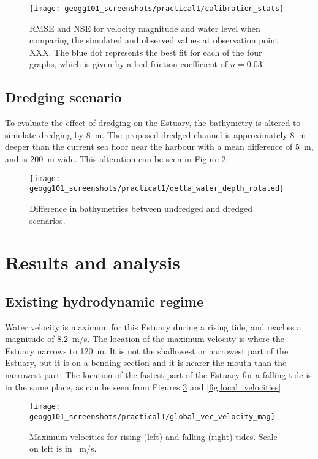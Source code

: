 \documentclass{article}
\begin{document}
\begin{figure}[hbp]
    \centering
    \texttt{[image: geogg101\_screenshots/practical1/calibration\_stats]}
    \caption{RMSE and NSE for velocity magnitude and water level when comparing the simulated and observed values at observation point XXX. The blue dot represents the best fit for each of the four graphs, which is given by a bed friction coefficient of $n = 0.03$.}
    \label{fig:calibration_stats}
\end{figure}

\subsection{Dredging scenario}

To evaluate the effect of dredging on the Estuary, the bathymetry is altered to simulate dredging by \SI{8}{m}. The proposed dredged channel is approximately \SI{8}{m} deeper than the current sea floor near the harbour with a mean difference of \SI{5}{m}, and is \SI{200}{m} wide. This alteration can be seen in Figure \ref{fig:delta_depth}.

\begin{figure}[hbp]
    \centering
    \texttt{[image: geogg101\_screenshots/practical1/delta\_water\_depth\_rotated]}
    \caption{Difference in bathymetries between undredged and dredged scenarios.}
    \label{fig:delta_depth}
\end{figure}

\newpage
\section{Results and analysis}

\subsection{Existing hydrodynamic regime}

Water velocity is maximum for this Estuary during a rising tide, and reaches a magnitude of \SI{8.2}{m/s}. The location of the maximum velocity is where the Estuary narrows to \SI{120}{m}. It is not the shallowest or narrowest part of the Estuary, but it is on a bending section and it is nearer the mouth than the narrowest part. The location of the fastest part of the Estuary for a falling tide is in the same place, as can be seen from Figures \ref{fig:global_velocities} and \ref{fig:local_velocities}.

\begin{figure}[!h]
    \centering
    \texttt{[image: geogg101\_screenshots/practical1/global\_vec\_velocity\_mag]}
    \caption{Maximum velocities for rising (left) and falling (right) tides. Scale on left is in \SI{}{m/s}.}
    \label{fig:global_velocities}
\end{figure}
\end{document}
